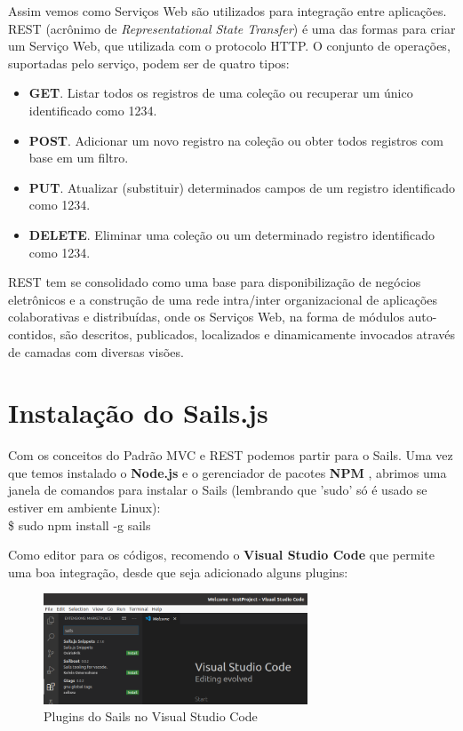 \documentclass[a4paper,11pt]{article}
\begin{document}
Assim vemos como Serviços Web são utilizados para integração entre aplicações. REST (acrônimo de \textit{Representational State Transfer}) é uma das formas para criar um Serviço Web, que  utilizada com o protocolo HTTP. O conjunto de operações, suportadas pelo serviço, podem ser de quatro tipos: \vspace{-1em}
\begin{itemize}
  \item \textbf{GET}. Listar todos os registros de uma coleção ou recuperar um único identificado como 1234.
  \item \textbf{POST}. Adicionar um novo registro na coleção ou obter todos registros com base em um filtro.
  \item \textbf{PUT}. Atualizar (substituir) determinados campos de um registro identificado como 1234.
  \item \textbf{DELETE}. Eliminar uma coleção ou um determinado registro identificado como 1234.
\end{itemize}

REST tem se consolidado como uma base para disponibilização de negócios eletrônicos e a construção de uma rede intra/inter organizacional de aplicações colaborativas e distribuídas, onde os Serviços Web, na forma de módulos auto-contidos, são descritos, publicados, localizados e dinamicamente invocados através de camadas com diversas visões.

\section{Instalação do Sails.js}
Com os conceitos do Padrão MVC e REST podemos partir para o Sails. Uma vez que temos instalado o \textbf{Node.js} e o gerenciador de pacotes \textbf{NPM} \cite{npm}, abrimos uma janela de comandos para instalar o Sails (lembrando que 'sudo' só é usado se estiver em ambiente Linux): \\
{\ttfamily\$ sudo npm install -g sails}

Como editor para os códigos, recomendo o \textbf{Visual Studio Code} que permite uma boa integração, desde que seja adicionado alguns plugins:
\begin{figure}[H]
	\centering
	\includegraphics[width=0.7\textwidth]{imagens/VisualStudioCode.png}
	\caption{Plugins do Sails no Visual Studio Code}
\end{figure}
\end{document}
